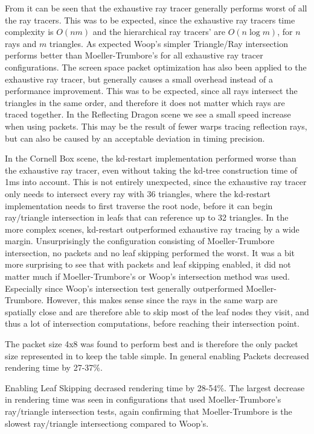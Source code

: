 From  it can be seen that the exhaustive ray
tracer generally performs worst of all the ray tracers. This was to be expected,
since the exhaustive ray tracers time complexity is $O(nm)$ and the hierarchical
ray tracers' are $O(n \log m)$, for $n$ rays and $m$ triangles. As expected
Woop's simpler Triangle/Ray intersection performs better than Moeller-Trumbore's
for all exhaustive ray tracer configurations. The screen space packet
optimization has also been applied to the exhaustive ray tracer, but generally
causes a small overhead instead of a performance improvement. This was to be
expected, since all rays intersect the triangles in the same order, and
therefore it does not matter which rays are traced together. In the Reflecting
Dragon scene we see a small speed increase when using packets. This may be the
result of fewer warps tracing reflection rays, but can also be caused by an
acceptable deviation in timing precision.

In the Cornell Box scene, the kd-restart implementation performed worse than the
exhaustive ray tracer, even without taking the kd-tree construction time of 1ms
into account. This is not entirely unexpected, since the exhaustive ray tracer
only needs to intersect every ray with 36 triangles, where the kd-restart
implementation needs to first traverse the root node, before it can begin
ray/triangle intersection in leafs that can reference up to 32 triangles. In the
more complex scenes, kd-restart outperformed exhaustive ray tracing by a wide
margin. Unsurprisingly the configuration consisting of Moeller-Trumbore
intersection, no packets and no leaf skipping performed the worst. It was a bit
more surprising to see that with packets and leaf skipping enabled, it did not
matter much if Moeller-Trumbore's or Woop's intersection method was
used. Especially since Woop's intersection test generally outperformed
Moeller-Trumbore. However, this makes sense since the rays in the same warp are
spatially close and are therefore able to skip most of the leaf nodes they
visit, and thus a lot of intersection computations, before reaching their
intersection point.

The packet size 4x8 was found to perform best and is therefore the only packet
size represented in  to keep the table
simple. In general enabling Packets decreased rendering time by 27-37\%.

Enabling Leaf Skipping decrased rendering time by 28-54\%. The largest decrease
in rendering time was seen in configurations that used Moeller-Trumbore's
ray/triangle intersection tests, again confirming that Moeller-Trumbore is the
slowest ray/triangle intersectiong compared to Woop's.

